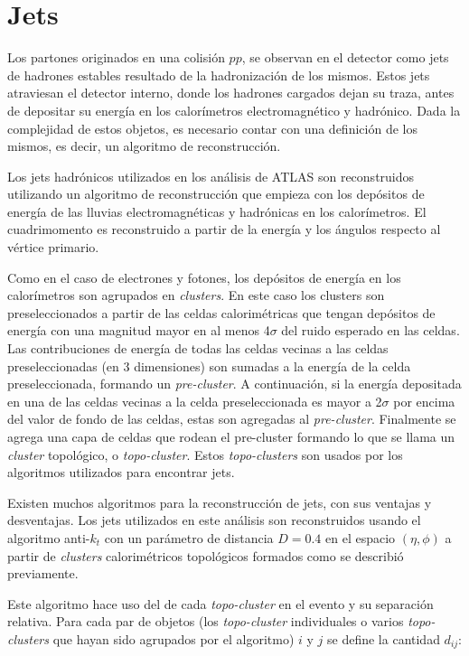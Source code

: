 \section{Jets}
\label{sec:jet_obj}

Los partones originados en una colisión $pp$, se observan en el detector como
jets de hadrones estables resultado de la hadronización de los mismos. Estos
jets atraviesan el detector interno, donde los hadrones cargados dejan su traza,
antes de depositar su energía en los calorímetros electromagnético y hadrónico.
Dada la complejidad de estos objetos, es necesario contar con una definición
de los mismos, es decir, un algoritmo de reconstrucción.

Los jets hadrónicos utilizados en los análisis de ATLAS son reconstruidos utilizando
un algoritmo de reconstrucción que empieza con los depósitos de energía de las lluvias
electromagnéticas y hadrónicas en los calorímetros. El cuadrimomento es reconstruido
a partir de la energía y los ángulos respecto al vértice primario.

Como en el caso de electrones y fotones, los depósitos de energía en los
calorímetros son agrupados en \emph{clusters}. En este caso los clusters son
preseleccionados a partir de las celdas calorimétricas que tengan depósitos de
energía con una magnitud mayor en al menos 4$\sigma$ del ruido esperado en las
celdas. Las contribuciones de energía de todas las celdas vecinas a las celdas
preseleccionadas (en 3 dimensiones) son sumadas a la energía de la celda
preseleccionada, formando un \emph{pre-cluster}. A continuación, si la energía
depositada en una de las celdas vecinas a la celda preseleccionada es mayor a
2$\sigma$ por encima del valor de fondo de las celdas, estas son agregadas al
\emph{pre-cluster}. Finalmente se agrega una capa de celdas que rodean el pre-cluster
formando lo que se llama un \emph{cluster} topológico, o \emph{topo-cluster}.
Estos \emph{topo-clusters} son usados por los algoritmos
utilizados para encontrar jets.

Existen muchos algoritmos para la reconstrucción de jets, con sus ventajas y
desventajas. Los jets utilizados en este análisis son reconstruidos usando el
algoritmo anti-$k_t$\cite{Cacciari:2008gp} con un parámetro de distancia $D =
0.4$ en el espacio $(\eta, \phi)$ a partir de \emph{clusters} calorimétricos
topológicos\cite{Lampl:1099735} formados como se describió previamente.

Este algoritmo hace uso del {\pt} de cada \emph{topo-cluster} en el evento y su
separación relativa. Para cada par de objetos (los \emph{topo-cluster} individuales o
varios \emph{topo-clusters} que hayan sido agrupados por el algoritmo) $i$ y $j$ se
define la cantidad $d_{ij}$:

